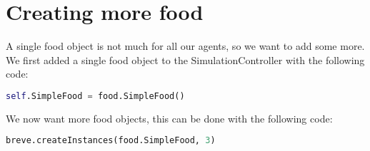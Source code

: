 \section{Creating more food}
A single food object is not much for all our agents, so we want to add some more. We first added a single food object to the SimulationController with the following code:
\begin{lstlisting}[language=Python]
self.SimpleFood = food.SimpleFood()
\end{lstlisting}
We now want more food objects, this can be done with the following code:
\begin{lstlisting}[language=Python]
breve.createInstances(food.SimpleFood, 3)
\end{lstlisting}


